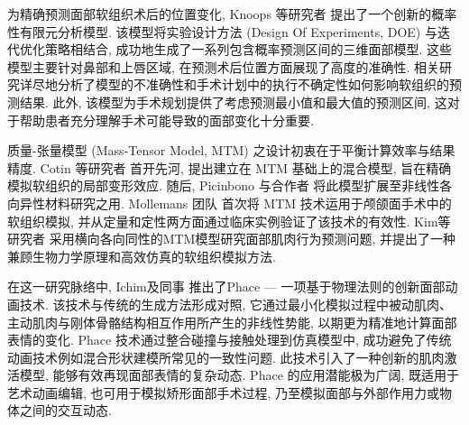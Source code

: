 为精确预测面部软组织术后的位置变化, Knoops 等研究者 \cite{knoopsNovelSoftTissue2018} 提出了一个创新的概率性有限元分析模型.
该模型将实验设计方法 (Design Of Experiments, DOE) 与迭代优化策略相结合, 成功地生成了一系列包含概率预测区间的三维面部模型.
这些模型主要针对鼻部和上唇区域, 在预测术后位置方面展现了高度的准确性.
相关研究详尽地分析了模型的不准确性和手术计划中的执行不确定性如何影响软组织的预测结果.
此外, 该模型为手术规划提供了考虑预测最小值和最大值的预测区间, 这对于帮助患者充分理解手术可能导致的面部变化十分重要.

质量-张量模型 (Mass-Tensor Model, MTM) 之设计初衷在于平衡计算效率与结果精度.
Cotin 等研究者 \cite{cotinHybridElasticModel2000} 首开先河, 提出建立在 MTM 基础上的混合模型, 旨在精确模拟软组织的局部变形效应.
随后, Picinbono 与合作者 \cite{picinbonoNonlinearAnisotropicElasticity2003} 将此模型扩展至非线性各向异性材料研究之用.
Mollemans 团队 \cite{mollemansPredictingSoftTissue2007} 首次将 MTM 技术运用于颅颌面手术中的软组织模拟, 并从定量和定性两方面通过临床实例验证了该技术的有效性.
Kim等研究者 \cite{kimNewSofttissueSimulation2010} 采用横向各向同性的MTM模型研究面部肌肉行为预测问题, 并提出了一种兼顾生物力学原理和高效仿真的软组织模拟方法.

在这一研究脉络中, Ichim及同事 \cite{ichimPhacePhysicsbasedFace2017} 推出了Phace --- 一项基于物理法则的创新面部动画技术.
该技术与传统的生成方法形成对照, 它通过最小化模拟过程中被动肌肉、主动肌肉与刚体骨骼结构相互作用所产生的非线性势能, 以期更为精准地计算面部表情的变化.
Phace 技术通过整合碰撞与接触处理到仿真模型中, 成功避免了传统动画技术例如混合形状建模所常见的一致性问题.
此技术引入了一种创新的肌肉激活模型, 能够有效再现面部表情的复杂动态.
Phace 的应用潜能极为广阔, 既适用于艺术动画编辑, 也可用于模拟矫形面部手术过程, 乃至模拟面部与外部作用力或物体之间的交互动态.

